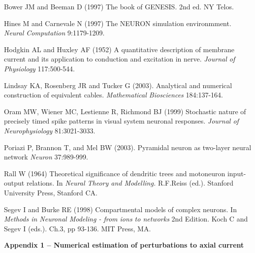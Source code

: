 
\begin{thebibliography}{99}

 Bower JM and Beeman D (1997) The
book of GENESIS. 2nd ed. NY Telos.

 Hines M and Carnevale N (1997) The
NEURON simulation environmment. \emph{Neural Computation}
9:1179-1209.

 Hodgkin AL and Huxley AF (1952) A
quantitative description of membrane current and its application
to conduction and excitation in nerve. \emph{Journal of
Physiology} 117:500-544.

 Lindsay KA, Rosenberg JR and
Tucker G (2003). Analytical and numerical construction of
equivalent cables. \emph{Mathematical Biosciences} 184:137-164.

 Oram MW, Wiener MC, Lestienne R, Richmond
BJ (1999) Stochastic nature of precisely timed spike patterns in
visual system neuronal responses. \emph{Journal of
Neurophysiology} 81:3021-3033.

 Poriazi P, Brannon T, and Mel BW (2003).
Pyramidal neuron as two-layer neural network \emph{Neuron}
37:989-999.

 Rall W (1964) Theoretical significance
of dendritic trees and motoneuron input-output relations. In
\emph{Neural Theory and Modelling.} R.F.Reiss  (ed.). Stanford
University Press, Stanford CA.

 Segev I and Burke RE (1998)
Compartmental models of complex neurons. In \emph{Methods in
Neuronal Modeling - from ions to networks} 2nd Edition. Koch C and
Segev I (eds.). Ch.3, pp 93-136. MIT Press, MA.

\end{thebibliography}

\pagebreak[4]

\textbf{Appendix 1 -- Numerical estimation of perturbations to axial current}

